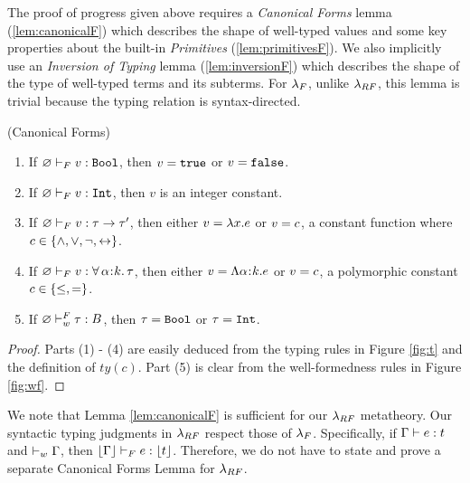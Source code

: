 \begin{fullversion}
%
The proof of progress given above requires a \emph{Canonical Forms} 
lemma (\cref{lem:canonicalF}) which describes the 
shape of well-typed values and some key properties 
about the built-in \emph{Primitives} (\cref{lem:primitivesF}).
%
We also implicitly use an \emph{Inversion of Typing} 
lemma (\cref{lem:inversionF}) which describes the shape of the 
type of well-typed terms and its subterms. For $\lambda_{F}$, 
unlike $\lambda_{RF}$, this lemma
is trivial because the typing relation is syntax-directed.


\begin{lemma}\label{lem:canonicalF} (Canonical Forms) 
\begin{enumerate}
    \item If ${\varnothing} \vdash_F {v} : {\texttt{Bool}}$, 
        then $v = \mathtt{true}$ or $v = \mathtt{false}$.
    \item If ${\varnothing} \vdash_F {v} : {\texttt{Int}}$, then $v$ is an integer constant.
    \item If ${\varnothing} \vdash_F {v} : {\tau \rightarrow \tau'}$, 
        then either $v = \lambda x. {e}$ or $v = c$, 
        a constant function where 
        $c \in \{\wedge, \vee, \neg, \leftrightarrow \}$.
    \item If ${\varnothing} \vdash_F {v} : {\forall\, \alpha\hspace{0.05em}{:}\hspace{0.05em} k.\, \tau}$, 
        then either $v = \Lambda{\alpha}\hspace{0.05em}{:}\hspace{0.05em}{\ensuremath{k}}.{e}$ 
        or $v = c$, a polymorphic constant $c \in \{\leq, =\}$.
    \item If ${\varnothing} \vdash_w^F {\tau} : {B}$,
        then $\tau = \texttt{Bool}$ or $\tau = \texttt{Int}$.
\end{enumerate}
\end{lemma}
\begin{proof}
    Parts (1) - (4) are easily deduced from the \sysf typing rules 
    in Figure \ref{fig:t} and the definition of $ty(c)$. 
    Part (5) is clear from the well-formedness rules in Figure \ref{fig:wf}.
\end{proof}

We note that 
Lemma \ref{lem:canonicalF} is sufficient for our $\lambda_{RF}$ metatheory.
Our syntactic typing judgments in $\lambda_{RF}$ respect those of $\lambda_{F}$.
Specifically, if ${\mathrm{\Gamma}} \vdash {\ensuremath{e}} : {t}$ and 
$\vdash_w {\mathrm{\Gamma}}$, then
${\lfloor{\mathrm{\Gamma}}\rfloor} \vdash_F {e} : {\lfloor{\ensuremath{t}}\rfloor}$.
Therefore, we do not have to state and 
prove a separate Canonical Forms Lemma for $\lambda_{RF}$.


\end{fullversion}
